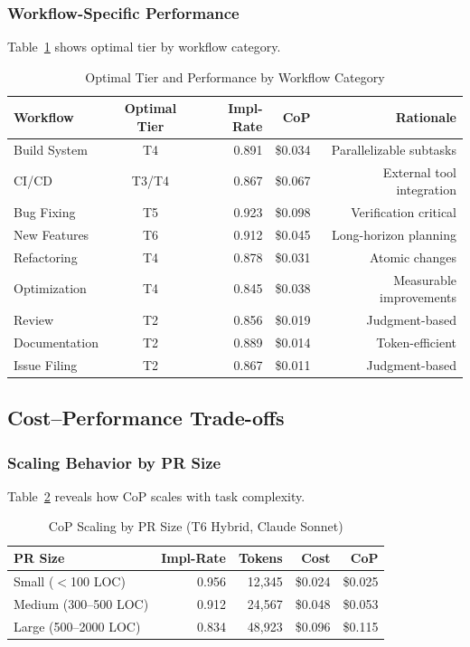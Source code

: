 \documentclass[11pt]{article}
\begin{document}
\subsubsection{Workflow-Specific Performance}
Table~\ref{tab:workflow-results} shows optimal tier by workflow category.

\begin{table}[H]
\centering
\caption{Optimal Tier and Performance by Workflow Category}
\label{tab:workflow-results}
\begin{tabular}{lcrrr}
\toprule
\textbf{Workflow} & \textbf{Optimal Tier} & \textbf{Impl-Rate} & \textbf{CoP} & \textbf{Rationale} \\
\midrule
Build System & T4 & 0.891 & \$0.034 & Parallelizable subtasks \\
CI/CD & T3/T4 & 0.867 & \$0.067 & External tool integration \\
Bug Fixing & T5 & 0.923 & \$0.098 & Verification critical \\
New Features & T6 & 0.912 & \$0.045 & Long-horizon planning \\
Refactoring & T4 & 0.878 & \$0.031 & Atomic changes \\
Optimization & T4 & 0.845 & \$0.038 & Measurable improvements \\
Review & T2 & 0.856 & \$0.019 & Judgment-based \\
Documentation & T2 & 0.889 & \$0.014 & Token-efficient \\
Issue Filing & T2 & 0.867 & \$0.011 & Judgment-based \\
\bottomrule
\end{tabular}
\end{table}

\subsection{Cost--Performance Trade-offs}

\subsubsection{Scaling Behavior by PR Size}
Table~\ref{tab:size-scaling} reveals how CoP scales with task complexity.

\begin{table}[H]
\centering
\caption{CoP Scaling by PR Size (T6 Hybrid, Claude Sonnet)}
\label{tab:size-scaling}
\begin{tabular}{lrrrr}
\toprule
\textbf{PR Size} & \textbf{Impl-Rate} & \textbf{Tokens} & \textbf{Cost} & \textbf{CoP} \\
\midrule
Small ($<$100 LOC) & 0.956 & 12,345 & \$0.024 & \$0.025 \\
Medium (300--500 LOC) & 0.912 & 24,567 & \$0.048 & \$0.053 \\
Large (500--2000 LOC) & 0.834 & 48,923 & \$0.096 & \$0.115 \\
\bottomrule
\end{tabular}
\end{table}
\end{document}
